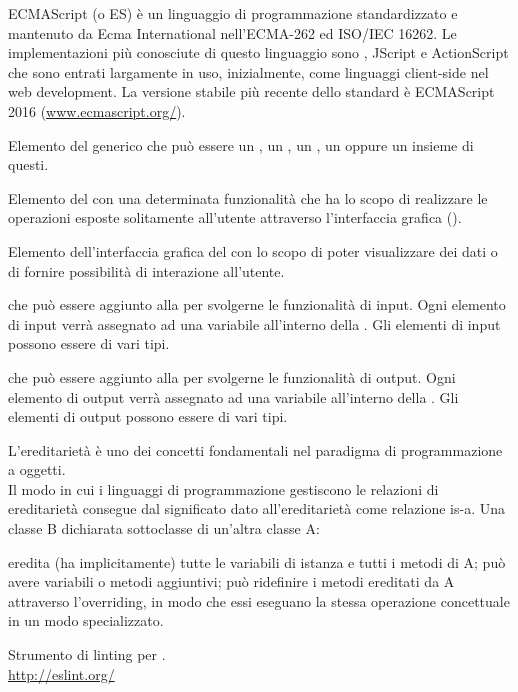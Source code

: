 ECMAScript (o ES) è un linguaggio di programmazione standardizzato e mantenuto da Ecma International nell'ECMA-262 ed ISO/IEC 16262. Le implementazioni più conosciute di questo linguaggio sono , JScript e ActionScript che sono entrati largamente in uso, inizialmente, come linguaggi client-side nel web development.
La versione stabile più recente dello standard è ECMAScript 2016 (\url{www.ecmascript.org/}).

Elemento del  generico che può essere un , un , un , un  oppure un insieme di questi.

Elemento del  con una determinata funzionalità che ha lo scopo di realizzare le operazioni esposte solitamente all'utente attraverso l’interfaccia grafica ().

Elemento dell’interfaccia grafica del  con lo scopo di poter visualizzare dei dati o di fornire possibilità di interazione all’utente.

 che può essere aggiunto alla  per svolgerne le funzionalità di input. Ogni elemento di input verrà assegnato ad una variabile all’interno della . Gli elementi di input possono essere di vari tipi.

 che può essere aggiunto alla  per svolgerne le funzionalità di output. Ogni elemento di output verrà assegnato ad una variabile all’interno della . Gli elementi di output possono essere di vari tipi.

L'ereditarietà è uno dei concetti fondamentali nel paradigma di programmazione a oggetti.\\
Il modo in cui i linguaggi di programmazione gestiscono le relazioni di ereditarietà consegue dal significato dato all'ereditarietà come relazione is-a. Una classe B dichiarata sottoclasse di un'altra classe A:
\begin{itemize}
    \list eredita (ha implicitamente) tutte le variabili di istanza e tutti i metodi di A;
    \list può avere variabili o metodi aggiuntivi;
    \list può ridefinire i metodi ereditati da A attraverso l'overriding, in modo che essi eseguano la stessa operazione concettuale in un modo specializzato.
\end{itemize}

Strumento di linting per .\\
\url{http://eslint.org/}
\clearpage
